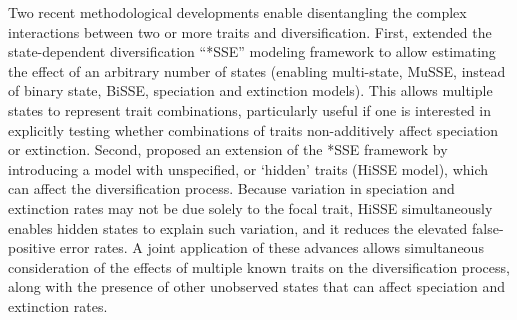 Two recent methodological developments enable disentangling the complex interactions between two or more traits and diversification.
First, \citet{fitzjohn_2012} extended the state-dependent diversification ``*SSE'' modeling framework \citep{maddison_2007} to allow estimating the effect of an arbitrary number of states (enabling multi-state, MuSSE, instead of binary state, BiSSE, speciation and extinction models).
This allows multiple states to represent trait combinations, particularly useful if one is interested in explicitly testing whether combinations of traits non-additively affect speciation or extinction. 
Second, \citet{beaulieu_2016}  proposed an extension of the *SSE framework by introducing a model with unspecified, or `hidden' traits (HiSSE model), which can affect the diversification process.
Because variation in speciation and extinction rates may not be due solely to the focal trait, HiSSE simultaneously enables hidden states to explain such variation, and it reduces the elevated false-positive error rates.
A joint application of these advances allows simultaneous consideration of the effects of multiple known traits on the diversification process, along with the presence of other unobserved states that can affect speciation and extinction rates. 


